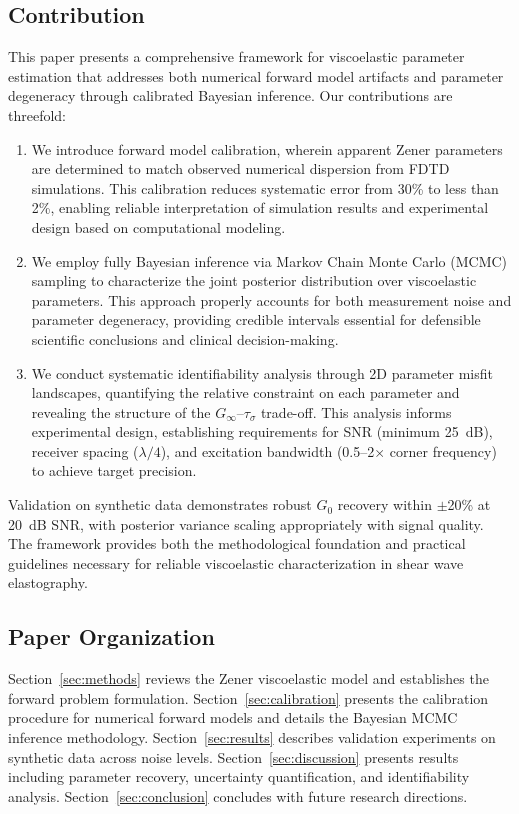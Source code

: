 \documentclass[journal]{IEEEtran}
\begin{document}
\subsection{Contribution}

This paper presents a comprehensive framework for viscoelastic parameter estimation that addresses both numerical forward model artifacts and parameter degeneracy through calibrated Bayesian inference. Our contributions are threefold:

\begin{enumerate}
\item We introduce forward model calibration, wherein apparent Zener parameters are determined to match observed numerical dispersion from FDTD simulations. This calibration reduces systematic error from 30\% to less than 2\%, enabling reliable interpretation of simulation results and experimental design based on computational modeling.

\item We employ fully Bayesian inference via Markov Chain Monte Carlo (MCMC) sampling to characterize the joint posterior distribution over viscoelastic parameters. This approach properly accounts for both measurement noise and parameter degeneracy, providing credible intervals essential for defensible scientific conclusions and clinical decision-making.

\item We conduct systematic identifiability analysis through 2D parameter misfit landscapes, quantifying the relative constraint on each parameter and revealing the structure of the $G_\infty$--$\tau_\sigma$ trade-off. This analysis informs experimental design, establishing requirements for SNR (minimum 25~dB), receiver spacing ($\lambda/4$), and excitation bandwidth (0.5--2$\times$ corner frequency) to achieve target precision.
\end{enumerate}

Validation on synthetic data demonstrates robust $G_0$ recovery within $\pm$20\% at 20~dB SNR, with posterior variance scaling appropriately with signal quality. The framework provides both the methodological foundation and practical guidelines necessary for reliable viscoelastic characterization in shear wave elastography.

\subsection{Paper Organization}

Section~\ref{sec:methods} reviews the Zener viscoelastic model and establishes the forward problem formulation. Section~\ref{sec:calibration} presents the calibration procedure for numerical forward models and details the Bayesian MCMC inference methodology. Section~\ref{sec:results} describes validation experiments on synthetic data across noise levels. Section~\ref{sec:discussion} presents results including parameter recovery, uncertainty quantification, and identifiability analysis. Section~\ref{sec:conclusion} concludes with future research directions.
\end{document}
